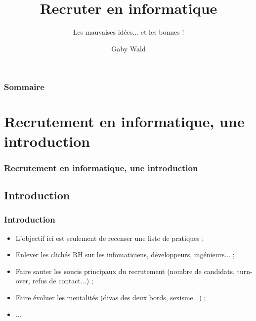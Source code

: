 \documentclass[slidetop,11pt]{beamer}
\title{Recruter en informatique}
\subtitle{Les mauvaises id{\'e}es... et les bonnes !}
\author{Gaby Wald}
\institute{\emph{to be defined}}
\begin{document}
\frame[plain]{\titlepage } 
%


\begin{frame}
	\frametitle{Sommaire}
	\small \tableofcontents[hideallsubsections]
\end{frame} 

\section{Recrutement en informatique, une introduction}
\begin{frame}
	\frametitle{Recrutement en informatique, une introduction}
	\tableofcontents[sections=1,currentsection,subsectionstyle=show/shaded/hide] %
\end{frame}

\subsection{Introduction}
\begin{frame}
	\frametitle{Introduction}
	\begin{itemize}
		\item L'objectif ici est seulement de recenser une liste de pratiques ; 
		\item Enlever les clich{\'e}s RH sur les infomaticiens, d{\'e}veloppeurs, ing{\'e}nieurs... ; 
		\item Faire sauter les soucis principaux du recrutement (nombre de candidats, turn-over, refus de contact...) ;
		\item Faire {\'e}voluer les mentalit{\'e}s (divas des deux bords, sexisme...) ; 
		\item ...  
	\end{itemize}
\end{frame}
\end{document}
